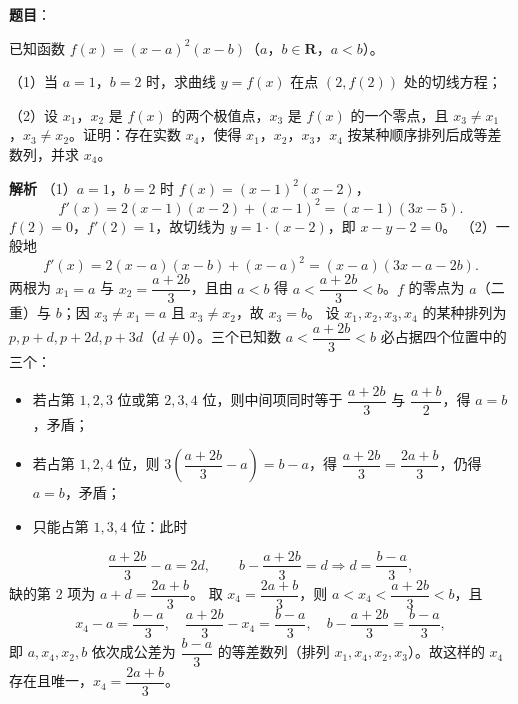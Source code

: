 \begin{answer}

\textbf{题目}：

已知函数 $f(x)=(x-a)^2(x-b)$（$a$，$b\in\mathbf R$，$a<b$）。

（1）当 $a=1$，$b=2$ 时，求曲线 $y=f(x)$ 在点 $(2,f(2))$ 处的切线方程；

（2）设 $x_1$，$x_2$ 是 $f(x)$ 的两个极值点，$x_3$ 是 $f(x)$ 的一个零点，且 $x_3\neq x_1$，$x_3\neq x_2$。证明：存在实数 $x_4$，使得 $x_1$，$x_2$，$x_3$，$x_4$ 按某种顺序排列后成等差数列，并求 $x_4$。

\textbf{解析}
（1）$a=1$，$b=2$ 时 $f(x)=(x-1)^2(x-2)$，
\nopagebreak[4]
\[f'(x)=2(x-1)(x-2)+(x-1)^2=(x-1)(3x-5).\]
$f(2)=0$，$f'(2)=1$，故切线为 $y=1\cdot(x-2)$，即 $x-y-2=0$。
（2）一般地
\nopagebreak[4]
\[f'(x)=2(x-a)(x-b)+(x-a)^2=(x-a)\left(3x-a-2b\right).\]
两根为 $x_1=a$ 与 $x_2=\dfrac{a+2b}3$，且由 $a<b$ 得 $a<\dfrac{a+2b}3<b$。$f$ 的零点为 $a$（二重）与 $b$；因 $x_3\neq x_1=a$ 且 $x_3\neq x_2$，故 $x_3=b$。
设 $x_1,x_2,x_3,x_4$ 的某种排列为 $p,p+d,p+2d,p+3d$（$d\neq0$）。三个已知数 $a<\dfrac{a+2b}3<b$ 必占据四个位置中的三个：
\begin{itemize}
\item 若占第 $1,2,3$ 位或第 $2,3,4$ 位，则中间项同时等于 $\dfrac{a+2b}3$ 与 $\dfrac{a+b}2$，得 $a=b$，矛盾；
\item 若占第 $1,2,4$ 位，则 $3\left(\dfrac{a+2b}3-a\right)=b-a$，得 $\dfrac{a+2b}3=\dfrac{2a+b}3$，仍得 $a=b$，矛盾；
\item 只能占第 $1,3,4$ 位：此时
\end{itemize}
\nopagebreak[4]
\[\frac{a+2b}3-a=2d,\qquad b-\frac{a+2b}3=d\Rightarrow d=\frac{b-a}3,\]
缺的第 $2$ 项为 $a+d=\dfrac{2a+b}3$。
取 $x_4=\dfrac{2a+b}3$，则 $a<x_4<\dfrac{a+2b}3<b$，且
\nopagebreak[4]
\[x_4-a=\frac{b-a}3,\quad \frac{a+2b}3-x_4=\frac{b-a}3,\quad b-\frac{a+2b}3=\frac{b-a}3,\]
即 $a,x_4,x_2,b$ 依次成公差为 $\dfrac{b-a}3$ 的等差数列（排列 $x_1,x_4,x_2,x_3$）。故这样的 $x_4$ 存在且唯一，$x_4=\dfrac{2a+b}3$。


\end{answer}
